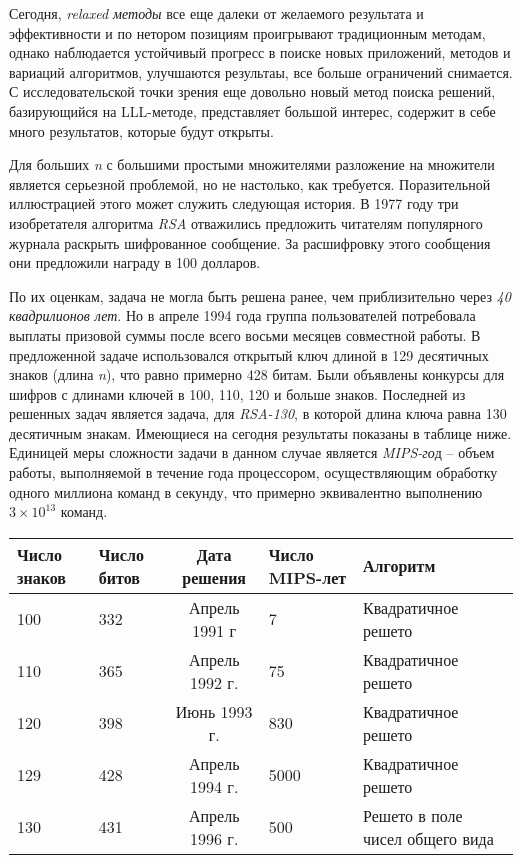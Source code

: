   Сегодня, \textit{relaxed методы} все еще далеки от желаемого результата и эффективности и по нетором позициям проигрывают традиционным методам,
  однако наблюдается устойчивый прогресс в поиске новых приложений, методов и вариаций алгоритмов, улучшаются результаы, все больше ограничений
  снимается. С исследовательской точки зрения еще довольно новый метод поиска решений, базирующийся на LLL-методе, представляет большой интерес,
  содержит в себе много результатов, которые будут открыты.
  
  Для больших \textit{n} с большими простыми множителями разложение на множители является серьезной проблемой, но не настолько, как требуется. 
  Поразительной иллюстрацией этого может служить следующая история. В 1977 году три изобретателя алгоритма
\textit{RSA} отважились предложить читателям 
  популярного журнала раскрыть шифрованное сообщение. За расшифровку этого сообщения они предложили
награду в 100 долларов.
  
  По их оценкам, задача не могла быть решена ранее, чем приблизительно через \textit{40 квадрилионов лет}. Но в апреле 1994 года группа пользователей 
  потребовала выплаты
призовой суммы после всего восьми месяцев совместной работы. В предложенной задаче использовался открытый ключ длиной в
  129 десятичных знаков (длина \textit{n}), что
равно примерно 428 битам. Были объявлены конкурсы для шифров с длинами ключей в 100, 110, 120
  и больше знаков. Последней из
решенных задач является задача, для \textit{RSA-130}, в которой длина ключа 
  равна 130 десятичным знакам. Имеющиеся на сегодня результаты показаны в таблице ниже. Единицей меры
сложности задачи в данном случае является \textit{MIPS-го}д – 
  объем работы, выполняемой в
течение года процессором, осуществляющим обработку одного миллиона команд в секунду, что примерно эквивалентно 
  выполнению {$3\times10^13$} команд.
  
  \begin{table}[ht]
    \begin{tabular}{@{}p{2.5cm}p{2.5cm}cp{2.5cm}p{4.5cm}@{}}
    \toprule
    \textbf{Число знаков} & \textbf{Число битов} & \textbf{Дата решения} & \textbf{Число MIPS-лет} & \textbf{Алгоритм} \\ \midrule
    100                              & 332                  & Апрель 1991 г         & 7                       & Квадратичное решето              \\
    110                              & 365                  & Апрель 1992 г.        & 75                      & Квадратичное решето              \\
    120                              & 398                  & Июнь 1993 г.          & 830                     & Квадратичное решето              \\
    129                              & 428                  & Апрель 1994 г.        & 5000                    & Квадратичное решето              \\
    130                              & 431                  & Апрель 1996 г.        & 500                     & Решето в поле чисел общего вида  \\ \bottomrule
    \end{tabular}
  \end{table}
  
